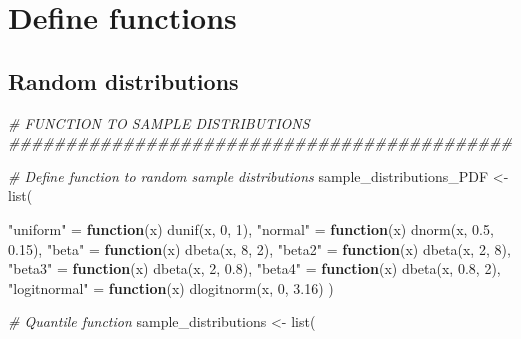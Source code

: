 \documentclass[
  11pt,
]{article}
\newenvironment{Shaded}{\begin{snugshade}}{\end{snugshade}}
\newcommand{\CommentTok}[1]{\textcolor[rgb]{0.56,0.35,0.01}{\textit{#1}}}
\newcommand{\ControlFlowTok}[1]{\textcolor[rgb]{0.13,0.29,0.53}{\textbf{#1}}}
\newcommand{\DecValTok}[1]{\textcolor[rgb]{0.00,0.00,0.81}{#1}}
\newcommand{\FloatTok}[1]{\textcolor[rgb]{0.00,0.00,0.81}{#1}}
\newcommand{\FunctionTok}[1]{\textcolor[rgb]{0.00,0.00,0.00}{#1}}
\newcommand{\NormalTok}[1]{#1}
\newcommand{\OtherTok}[1]{\textcolor[rgb]{0.56,0.35,0.01}{#1}}
\newcommand{\StringTok}[1]{\textcolor[rgb]{0.31,0.60,0.02}{#1}}
\begin{document}
\newpage

\hypertarget{define-functions}{%
\section{Define functions}\label{define-functions}}

\hypertarget{random-distributions}{%
\subsection{Random distributions}\label{random-distributions}}

\begin{Shaded}
\begin{Highlighting}[]
\CommentTok{\# FUNCTION TO SAMPLE DISTRIBUTIONS \#\#\#\#\#\#\#\#\#\#\#\#\#\#\#\#\#\#\#\#\#\#\#\#\#\#\#\#\#\#\#\#\#\#\#\#\#\#\#\#\#\#\#\#}

\CommentTok{\# Define function to random sample distributions}
\NormalTok{sample\_distributions\_PDF }\OtherTok{\textless{}{-}} \FunctionTok{list}\NormalTok{(}
  
  \StringTok{"uniform"} \OtherTok{=} \ControlFlowTok{function}\NormalTok{(x) }\FunctionTok{dunif}\NormalTok{(x, }\DecValTok{0}\NormalTok{, }\DecValTok{1}\NormalTok{),}
  \StringTok{"normal"} \OtherTok{=} \ControlFlowTok{function}\NormalTok{(x) }\FunctionTok{dnorm}\NormalTok{(x, }\FloatTok{0.5}\NormalTok{, }\FloatTok{0.15}\NormalTok{),}
  \StringTok{"beta"} \OtherTok{=} \ControlFlowTok{function}\NormalTok{(x) }\FunctionTok{dbeta}\NormalTok{(x, }\DecValTok{8}\NormalTok{, }\DecValTok{2}\NormalTok{),}
  \StringTok{"beta2"} \OtherTok{=} \ControlFlowTok{function}\NormalTok{(x) }\FunctionTok{dbeta}\NormalTok{(x, }\DecValTok{2}\NormalTok{, }\DecValTok{8}\NormalTok{),}
  \StringTok{"beta3"} \OtherTok{=} \ControlFlowTok{function}\NormalTok{(x) }\FunctionTok{dbeta}\NormalTok{(x, }\DecValTok{2}\NormalTok{, }\FloatTok{0.8}\NormalTok{),}
  \StringTok{"beta4"} \OtherTok{=} \ControlFlowTok{function}\NormalTok{(x) }\FunctionTok{dbeta}\NormalTok{(x, }\FloatTok{0.8}\NormalTok{, }\DecValTok{2}\NormalTok{),}
  \StringTok{"logitnormal"} \OtherTok{=} \ControlFlowTok{function}\NormalTok{(x) }\FunctionTok{dlogitnorm}\NormalTok{(x, }\DecValTok{0}\NormalTok{, }\FloatTok{3.16}\NormalTok{)}
\NormalTok{)}

\CommentTok{\# Quantile function}
\NormalTok{sample\_distributions }\OtherTok{\textless{}{-}} \FunctionTok{list}\NormalTok{(}
  

\end{Highlighting}
\end{Shaded}
\end{document}

